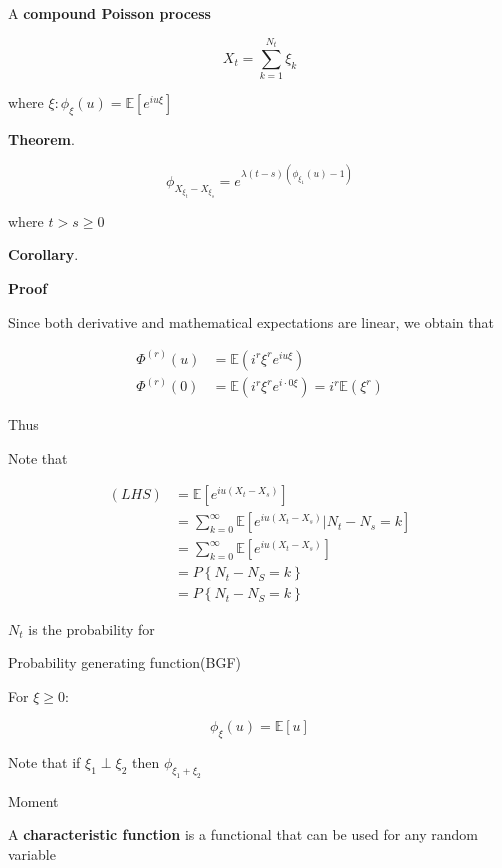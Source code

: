 \documentclass[12pt]{article}
\theoremstyle{nonumberbreak}
\begin{document}
A \textbf{compound Poisson process}

$$
X_t = \sum_{k=1}^{N_t} \xi_k
$$

where $\xi: \phi_\xi (u) = \mathbb{E} [e^{iu\xi} ]$



\begin{theorem}
\textbf{Theorem}.

$$
\phi_{X_{\xi_t} - X_{\xi_s}} = e^{\lambda(t-s) \left( \phi_{\xi_1}(u) - 1 \right)}
$$

where $t > s \ge 0$

\textbf{Corollary}.


\end{theorem}


\textbf{Proof} 

Since both derivative and mathematical expectations are linear, we obtain that

$$
\begin{aligned}
\Phi^{(r)}(u) &= \mathbb{E}(i^r \xi^r e^{iu\xi}) \\[8pt]
\Phi^{(r)}(0) &= \mathbb{E}(i^r \xi^r e^{i\cdot 0 \xi}) = i^r \mathbb{E} (\xi^r)
\end{aligned}
$$

Thus 


Note that 

$$
\begin{aligned}
(LHS) &= \mathbb{E} \left[ e^{iu (X_t - X_s)} \right] \\[8pt]
&= \sum_{k=0}^\infty \mathbb{E} \left[ e^{iu(X_t - X_s)} \vert N_t - N_s = k \right] \\[8pt]
&= \sum_{k=0}^\infty \mathbb{E} \left[ e^{iu(X_t - X_s)}\right] \\[8pt]
&= P\left\{ N_t - N_S = k \right\} \\[8pt]
&= P\left\{ N_t - N_S = k \right\} 
\end{aligned}
$$







$N_t$ is the probability for 


Probability generating function(BGF)


For $\xi \ge 0$:

$$
\phi_\xi (u) = \mathbb{E}[u]
$$ 


Note that if $\xi_1 \perp \xi_2$ then  $\phi_{\xi_1+\xi_2}$




Moment 


A \textbf{characteristic function} is a functional that can be used for any random variable
\end{document}
